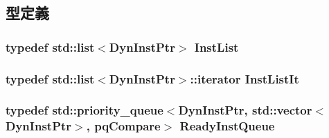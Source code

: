 \subsection{型定義}
\hypertarget{classBackEnd_1_1InstQueue_a989b991619bb58d499f278a94c31744b}{
\subsubsection[{InstList}]{\setlength{\rightskip}{0pt plus 5cm}typedef {\bf std::list}$<${\bf DynInstPtr}$>$ {\bf InstList}}}
\label{classBackEnd_1_1InstQueue_a989b991619bb58d499f278a94c31744b}
\hypertarget{classBackEnd_1_1InstQueue_a4da46d72d68fcd5bfe65dc701c358379}{
\subsubsection[{InstListIt}]{\setlength{\rightskip}{0pt plus 5cm}typedef {\bf std::list}$<${\bf DynInstPtr}$>$::iterator {\bf InstListIt}}}
\label{classBackEnd_1_1InstQueue_a4da46d72d68fcd5bfe65dc701c358379}
\hypertarget{classBackEnd_1_1InstQueue_a60636ae8f3b649078c4f1bdd3b20dcad}{
\subsubsection[{ReadyInstQueue}]{\setlength{\rightskip}{0pt plus 5cm}typedef std::priority\_\-queue$<${\bf DynInstPtr}, {\bf std::vector}$<${\bf DynInstPtr}$>$, {\bf pqCompare}$>$ {\bf ReadyInstQueue}}}
\label{classBackEnd_1_1InstQueue_a60636ae8f3b649078c4f1bdd3b20dcad}


